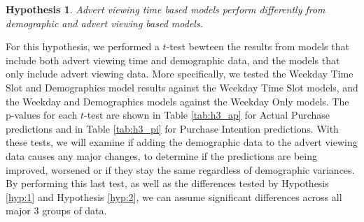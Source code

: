 \documentclass[review]{elsarticle}
\newtheorem{hyp}{Hypothesis}
\begin{document}
\begin{hyp}
\label{hyp:3}
Advert viewing time based models perform differently from demographic and advert viewing based models.
\end{hyp}

For this hypothesis, we performed a \(t\)-test bewteen the results from models that include both advert viewing time and demographic data, and the models that only include advert viewing data. More specifically, we tested the Weekday Time Slot and Demographics model results against the Weekday Time Slot models, and the Weekday and Demographics models against the Weekday Only models. The p-values for each \(t\)-test are shown in Table \ref{tab:h3_ap} for Actual Purchase predictions and in Table \ref{tab:h3_pi} for Purchase Intention predictions. With these tests, we will examine if adding the demographic data to the advert viewing data causes any major changes, to determine if the predictions are being improved, worsened or if they stay the same regardless of demographic variances. By performing this last test, as well as the differences tested by Hypothesis \ref{hyp:1} and Hypothesis \ref{hyp:2}, we can assume significant differences across all major 3 groups of data.
\end{document}
